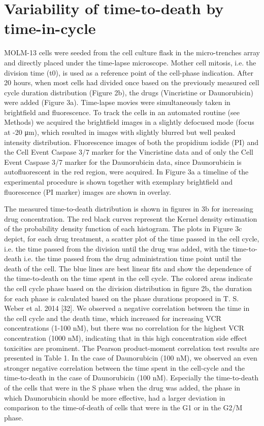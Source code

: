 \documentclass[pdftex,12pt,a4paper]{report}
\begin{document}
\section{Variability of time-to-death by time-in-cycle}

MOLM-13 cells were seeded from the cell culture flask in the micro-trenches array and directly placed under the time-lapse microscope. Mother cell mitosis, i.e. the division time (t0), is used as a reference point of the cell-phase indication. After 20 hours, when most cells had divided once based on the previously measured cell cycle duration distribution (Figure 2b), the drugs (Vincristine or Daunorubicin) were added (Figure 3a). Time-lapse movies were simultaneously taken in brightfield and fluorescence. To track the cells in an automated routine (see Methods) we acquired the brightfield images in a slightly defocused mode (focus at -20 μm), which resulted in images with slightly blurred but well peaked intensity distribution. Fluorescence images of both the propidium iodide (PI) and the Cell Event Caspase 3/7 marker for the Vincristine data and of only the Cell Event Caspase 3/7 marker for the Daunorubicin data, since Daunorubicin is autofluorescent in the red region, were acquired. In Figure 3a a timeline of the experimental procedure is shown together with exemplary brightfield and fluorescence (PI marker) images are shown in overlay.

The measured time-to-death distribution is shown in figures in 3b for increasing drug concentration. The red black curves represent the Kernel density estimation of the probability density function of each histogram. The plots in Figure 3c depict, for each drug treatment, a scatter plot of the time passed in the cell cycle, i.e. the time passed from the division until the drug was added, with the time-to-death i.e. the time passed from the drug administration time point until the death of the cell. The blue lines are best linear fits and show the dependence of the time-to-death on the time spent in the cell cycle. The colored areas indicate the cell cycle phase based on the division distribution in figure 2b, the duration for each phase is calculated based on the phase durations proposed in T. S. Weber et al. 2014 [32]. We observed a negative correlation between the time in the cell cycle and the death time, which increased for increasing VCR concentrations (1-100 nM), but there was no correlation for the highest VCR concentration (1000 nM), indicating that in this high concentration side effect toxicities are prominent. The Pearson product-moment correlation test results are presented in Table 1. In the case of Daunorubicin (100 nM), we observed an even stronger negative correlation between the time spent in the cell-cycle and the time-to-death in the case of Daunorubicin (100 nM). Especially the time-to-death of the cells that were in the S phase when the drug was added, the phase in which Daunorubicin should be more effective, had a larger deviation in comparison to the time-of-death of cells that were in the G1 or in the G2/M phase. 
\end{document}
